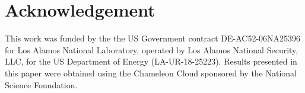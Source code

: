\section{Acknowledgement}
This work was funded by the the US Government contract DE-AC52-06NA25396 for Los Alamos National Laboratory, operated by Los Alamos National Security,
LLC, for the US Department of Energy (LA-UR-18-25223). Results presented in this paper were obtained using the Chameleon Cloud  sponsored by the National Science Foundation. 